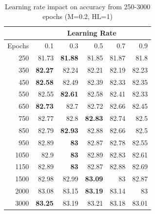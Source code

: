 \documentclass[12pt]{article}
\begin{document}
\begin{table}[htbp]
  \centering
  \caption{Learning rate impact on accuracy from 250-3000 epochs (M=0.2, HL=1)}
    \begin{tabular}{r|rrrrr}
    \toprule
          & \multicolumn{5}{c}{Learning Rate} \\
    \midrule
    \multicolumn{1}{l|}{Epochs} & 0.1   & 0.3   & 0.5   & 0.7   & 0.9 \\
    \midrule
    250   & 81.73 & \textbf{81.88} & 81.85 & 81.87 & 81.8 \\
    350   & \textbf{82.27} & 82.24 & 82.21 & 82.19 & 82.23 \\
    450   & \textbf{82.58} & 82.49 & 82.39 & 82.33 & 82.35 \\
    550   & 82.55 & \textbf{82.61} & 82.58 & 82.41 & 82.33 \\
    650   & \textbf{82.73} & 82.7  & 82.72 & 82.66 & 82.45 \\
    750   & 82.77 & 82.8  & \textbf{82.83} & 82.74 & 82.5 \\
    850   & 82.79 & \textbf{82.93} & 82.88 & 82.66 & 82.5 \\
    950   & 82.89 & \textbf{83} & 82.87 & 82.78 & 82.55 \\
    1050  & 82.9  & \textbf{83} & 82.89 & 82.83 & 82.61 \\
    1150  & 82.89 & \textbf{83} & 82.87 & 82.88 & 82.69 \\
    1500  & 82.98 & 82.99 & \textbf{83.09} & 83    & 82.87 \\
    2000  & 83.08 & 83.15 & \textbf{83.19} & 83.14 & 83 \\
    3000  & \textbf{83.25} & 83.19 & 83.21 & 83.18 & 83.01 \\
    \bottomrule
    \end{tabular}%
  \label{tab:addlabel}%
\end{table}%







\end{document}
